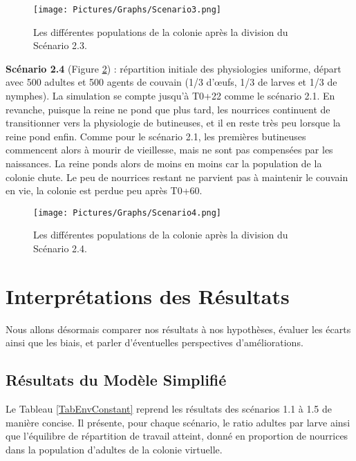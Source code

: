 	\begin{figure}
	\centering
	\texttt{[image: Pictures/Graphs/Scenario3.png]}
	\caption{Les différentes populations de la colonie après la division du Scénario 2.3.}
	\label{sc3}
	\end{figure}
		
		\textbf{Scénario 2.4} (Figure \ref{sc4}) : répartition initiale des physiologies uniforme, départ avec 500 adultes et 500 agents de couvain (1/3 d'œufs, 1/3 de larves et 1/3 de nymphes). La simulation se compte jusqu'à T0+22 comme le scénario 2.1. En revanche, puisque la reine ne pond que plus tard, les nourrices continuent de transitionner vers la physiologie de butineuses, et il en reste très peu lorsque la reine pond enfin. Comme pour le scénario 2.1, les premières butineuses commencent alors à mourir de vieillesse, mais ne sont pas compensées par les naissances. La reine ponds alors de moins en moins car la population de la colonie chute. Le peu de nourrices restant ne parvient pas à maintenir le couvain en vie, la colonie est perdue peu après T0+60.
	
	\begin{figure}
	\centering
	\texttt{[image: Pictures/Graphs/Scenario4.png]}
	\caption{Les différentes populations de la colonie après la division du Scénario 2.4.}
	\label{sc4}
	\end{figure}
	
	
	\section{Interprétations des Résultats}

	Nous allons désormais comparer nos résultats à nos hypothèses, évaluer les écarts ainsi que les biais, et parler d'éventuelles perspectives d'améliorations.
	
	\subsection{Résultats du Modèle Simplifié}
	
	Le Tableau \ref{TabEnvConstant} reprend les résultats des scénarios 1.1 à 1.5 de manière concise. Il présente, pour chaque scénario, le ratio adultes par larve ainsi que l'équilibre de répartition de travail atteint, donné en proportion de nourrices dans la population d'adultes de la colonie virtuelle.
	
